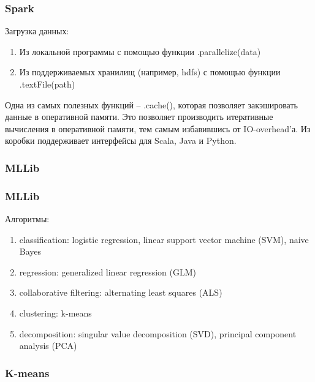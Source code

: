 \documentclass[12pt]{beamer}
\begin{document}
\begin{frame}\frametitle{Spark}
Загрузка данных:

\begin{enumerate}[--]
\item Из локальной программы с помощью функции .parallelize(data)
\item Из поддерживаемых хранилищ (например, hdfs) с помощью функции .textFile(path)
\end{enumerate}

Одна из самых полезных функций -- .cache(), которая позволяет закэшировать данные в оперативной памяти. Это позволяет производить итеративные вычисления в оперативной памяти, тем самым избавившись от IO-overhead'а. 
Из коробки поддерживает интерфейсы для Scala, Java и Python.
\end{frame}

\begin{frame}\frametitle{MLLib}
\end{frame}

\begin{frame}\frametitle{MLLib}
Алгоритмы:

\begin{enumerate}[--]
\item classification: logistic regression, linear support vector machine
(SVM), naive Bayes
\item regression: generalized linear regression (GLM)
\item collaborative filtering: alternating least squares (ALS)
\item clustering: k-means
\item decomposition: singular value decomposition (SVD), principal
component analysis (PCA)
\end{enumerate}
\end{frame}

\begin{frame}\frametitle{K-means}
\end{frame}
\end{document}
